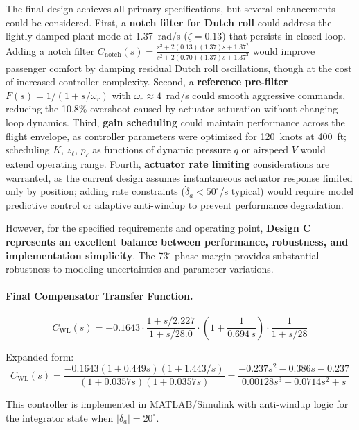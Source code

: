 The final design achieves all primary specifications, but several enhancements could be considered. First, a \textbf{notch filter for Dutch roll} could address the lightly-damped plant mode at 1.37~rad/s ($\zeta=0.13$) that persists in closed loop. Adding a notch filter $C_{\text{notch}}(s) = \frac{s^2 + 2(0.13)(1.37)s + 1.37^2}{s^2 + 2(0.70)(1.37)s + 1.37^2}$ would improve passenger comfort by damping residual Dutch roll oscillations, though at the cost of increased controller complexity. Second, a \textbf{reference pre-filter} $F(s) = 1/(1+s/\omega_r)$ with $\omega_r \approx 4$~rad/s could smooth aggressive commands, reducing the 10.8\% overshoot caused by actuator saturation without changing loop dynamics. Third, \textbf{gain scheduling} could maintain performance across the flight envelope, as controller parameters were optimized for 120~knots at 400~ft; scheduling $K$, $z_\ell$, $p_\ell$ as functions of dynamic pressure $\bar{q}$ or airspeed $V$ would extend operating range. Fourth, \textbf{actuator rate limiting} considerations are warranted, as the current design assumes instantaneous actuator response limited only by position; adding rate constraints ($\dot{\delta}_a < 50^\circ$/s typical) would require model predictive control or adaptive anti-windup to prevent performance degradation.

However, for the specified requirements and operating point, \textbf{Design C represents an excellent balance between performance, robustness, and implementation simplicity}. The 73$^\circ$ phase margin provides substantial robustness to modeling uncertainties and parameter variations.

\paragraph{Final Compensator Transfer Function.}

\begin{equation}
\boxed{~
C_{\mathrm{WL}}(s) = -0.1643 \cdot
\frac{1 + s/2.227}{1 + s/28.0} \cdot
\left(1 + \frac{1}{0.694\,s}\right) \cdot
\frac{1}{1 + s/28}
~}
\label{eq:final_controller}
\end{equation}

Expanded form:
\begin{equation}
C_{\mathrm{WL}}(s) = \frac{-0.1643(1 + 0.449s)(1 + 1.443/s)}{(1 + 0.0357s)(1 + 0.0357s)}
= \frac{-0.237s^2 - 0.386s - 0.237}{0.00128s^3 + 0.0714s^2 + s}
\end{equation}

This controller is implemented in MATLAB/Simulink with anti-windup logic for the integrator state when $|\delta_a| = 20^\circ$.

